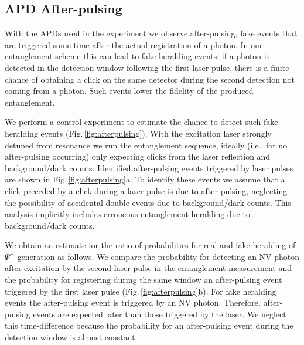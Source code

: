 \subsection{APD After-pulsing}

With the APDs used in the experiment we observe after-pulsing, fake events that are triggered some time after the actual registration of a photon. In our entanglement scheme this can lead to fake heralding events: if a photon is detected in the detection window following the first laser pulse, there is a finite chance of obtaining a click on the same detector during the second detection not coming from a photon. Such events lower the fidelity of the produced entanglement. %

We perform a control experiment to estimate the chance to detect such fake heralding events (Fig.\,\ref{fig:afterpulsing}). With the excitation laser strongly detuned from resonance we run the entanglement sequence, ideally (i.e., for no after-pulsing occurring) only expecting clicks from the laser reflection and background/dark counts. Identified after-pulsing events triggered by laser pulses are shown in Fig.\,\ref{fig:afterpulsing}a. To identify these events we assume that a click preceded by a click during a laser pulse is due to after-pulsing, neglecting the possibility of accidental double-events due to background/dark counts. This analysis implicitly includes erroneous entanglement heralding due to background/dark counts.

We obtain an estimate for the ratio of probabilities for real and fake heralding of $\Psi^+$ generation as follows. We compare the probability for detecting an NV photon after excitation by the second laser pulse in the entanglement measurement and the probability for registering during the same window an after-pulsing event triggered by the first laser pulse (Fig.\,\ref{fig:afterpulsing}b). For fake heralding events the after-pulsing event is triggered by an NV photon. Therefore, after-pulsing events are expected later than those triggered by the laser. We neglect this time-difference because the probability for an after-pulsing event during the detection window is almost constant.

